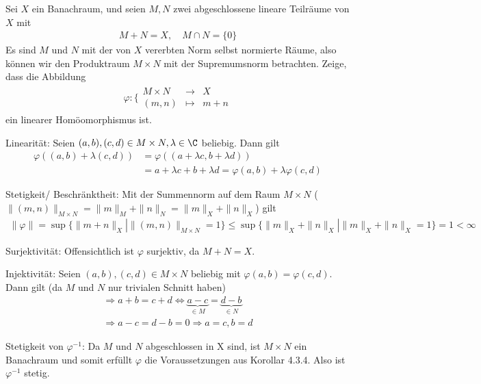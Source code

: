 \begin{exercise}
Sei $X$ ein Banachraum, und seien $M,N$ zwei abgeschlossene lineare Teilräume von $X$ mit
\begin{align*}
  M + N = X, \quad M \cap N = \{0\}
\end{align*}
Es sind $M$ und $N$ mit der von $X$ vererbten Norm selbst normierte Räume, also
können wir den Produktraum $M \times N$ mit der Supremumsnorm betrachten. Zeige,
dass die Abbildung
\begin{align*}
  \varphi: \bigg\{\begin{matrix}
    M \times N &\rightarrow& X \\
    (m,n) &\mapsto& m + n
  \end{matrix}
\end{align*}
ein linearer Homöomorphismus ist.
\end{exercise}
\begin{solution}
\item Linearität:
Seien $(a,b),(c,d)\in M\times N, \lambda \in \C $ beliebig. Dann gilt
\begin{align*}
  \varphi((a,b)+\lambda (c,d)) &= \varphi ((a+\lambda c, b + \lambda d)) \\
  &= a+\lambda c +  b + \lambda d = \varphi (a,b) + \lambda \varphi (c,d)
\end{align*}
 \item Stetigkeit/ Beschränktheit:
 Mit der Summennorm auf dem Raum $M \times N$ ($\|(m,n)\|_{M \times N} = \|m\|_M + \|n\|_N = \|m\|_X + \|n\|_X$) gilt
 \begin{align*}
      \|\varphi\| = \sup\{\|m+n\|_X | \|(m,n)\|_{M \times N} = 1\} \leq \sup\{\|m\|_X + \|n\|_X | \|m\|_X + \|n\|_X = 1\} = 1 < \infty
 \end{align*}

 \item Surjektivität:
 Offensichtlich ist $\varphi$ surjektiv, da $M + N = X$.

 \item Injektivität:
 Seien $(a,b),(c,d)\in M\times N$ beliebig mit $\varphi (a,b) = \varphi (c,d)$. Dann gilt (da $M$ und $N$ nur trivialen Schnitt haben)
 \begin{align*}
    \Rightarrow a+b = c+d \Leftrightarrow \underbrace{a-c}_{\in M} = \underbrace{d-b}_{\in N} \\
    \Rightarrow a-c = d-b = 0 \Rightarrow a=c, b=d
 \end{align*}

 \item Stetigkeit von $\varphi^{-1}$:
 Da $M$ und $N$ abgeschlossen in X sind, ist $M \times N$ ein Banachraum und somit erfüllt $\varphi$ die Voraussetzungen aus Korollar 4.3.4. Also ist $\varphi^{-1}$ stetig.

\end{solution}
